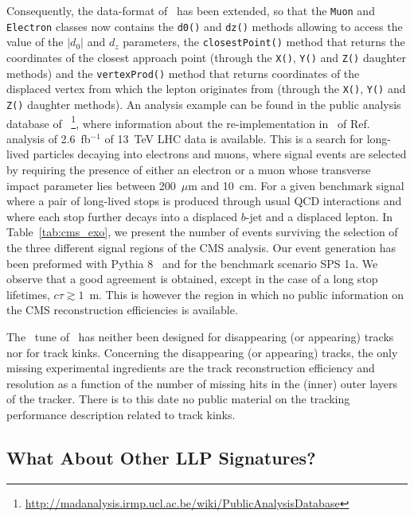 Consequently, the data-format of \MA\ has been extended, so that the \verb+Muon+ and
\verb+Electron+ classes now contains the \verb+d0()+ and \verb+dz()+ methods allowing to
access the value of the $|d_0|$ and $d_z$ parameters, the \verb+closestPoint()+
method that returns the coordinates of the closest approach point (through the
\verb+X()+, \verb+Y()+ and \verb+Z()+ daughter methods) and the
\verb+vertexProd()+ method that returns coordinates of the displaced vertex from
which the lepton originates from (through the \verb+X()+, \verb+Y()+ and
\verb+Z()+ daughter methods). An analysis example \cite{MA5:longlivedleptons} can be found in the public analysis database of \MA~\footnote{ \url{http://madanalysis.irmp.ucl.ac.be/wiki/PublicAnalysisDatabase}},
where information about the re-implementation in \MA\ of Ref.~\cite{CMS-PAS-EXO-16-022}  
analysis of 2.6~fb$^{-1}$ of 13~TeV LHC data is available. This is a search for long-lived particles decaying into electrons and muons, where signal
events are selected by requiring the presence of either an electron or a muon
whose transverse impact parameter lies between 200~$\mu$m and 10~cm. For a given
benchmark signal where a pair of long-lived stops is produced through usual QCD
interactions and where each stop further decays into a displaced $b$-jet and a
displaced lepton. In Table~\ref{tab:cms_exo}, we present the number of events
surviving the selection of the three different signal regions of the CMS analysis.
Our event generation has been preformed with {\sc Pythia} 8~\cite{Sjostrand:2007gs}
and for the benchmark
scenario SPS 1a.
We observe that a good agreement is obtained, except in the case of a long stop
lifetimes, $c\tau \gtrsim 1$~m. 
This is however the region in which no public information on
the CMS reconstruction efficiencies is available.

The \MA\ tune of \DEL\ has neither been designed for disappearing
(or appearing) tracks nor for track kinks. Concerning the disappearing (or appearing)
tracks, the only missing experimental ingredients are the track reconstruction efficiency
and resolution as a function of the number of missing hits in the (inner) outer
layers of the tracker. There is to this date no public material on the tracking
performance description related to track kinks.

\subsection{What About Other LLP Signatures?}

